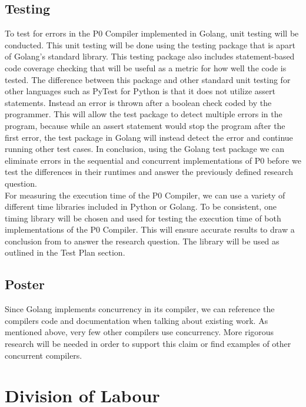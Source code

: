 \documentclass{article}
\begin{document}
\subsection{Testing}

To test for errors in the P0 Compiler implemented in Golang, unit testing will be conducted. This unit testing will be done using the  testing package that is apart of Golang's standard library. This testing package also includes statement-based code coverage checking that will be useful as a metric for how well the code is tested.
The difference between this package and other standard unit testing for other languages such as PyTest for Python is that it does not utilize assert statements.
Instead an error is thrown after a boolean check coded by the programmer. This will allow the test package to detect multiple errors in the program, because
while an assert statement would stop the program after the first error, the test package in Golang will instead detect the error and continue running other test cases.
In conclusion, using the Golang test package we can eliminate errors in the sequential and concurrent implementations of P0 before we test the differences in their runtimes
and answer the previously defined research question. \\    

For measuring the execution time of the P0 Compiler, we can use a variety of different time libraries included in Python or Golang. To be consistent, one timing library 
will be chosen
and used for testing the execution time of both implementations of the P0 Compiler. This will ensure 
accurate results to draw a conclusion from to answer the research question. The library will be used as outlined in the Test Plan section.

\subsection{Poster} %

Since Golang implements concurrency in its compiler, we can reference the
compilers code and documentation when talking about existing work.
As mentioned above, very few other compilers use concurrency.
More rigorous research will be needed in order to support this claim or
find examples of other concurrent compilers.

\section{Division of Labour} %
\end{document}
